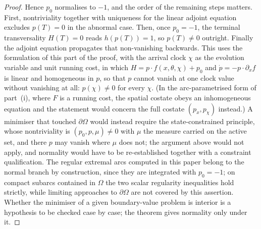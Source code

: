 \documentclass[12pt]{iopart}
\theoremstyle{plain}
\theoremstyle{definition}
\theoremstyle{plain}
\theoremstyle{remark}
\begin{document}
\begin{proof}
Hence $p_0$ normalises to $-1$, and the order of the remaining steps matters.
First, nontriviality together with uniqueness for the linear adjoint equation
excludes $p(T)=0$ in the abnormal case. Then, once $p_0=-1$, the terminal
transversality $H(T)=0$ reads $h(p(T))=1$, so $p(T)\neq0$ outright. Finally the
adjoint equation propagates that non-vanishing backwards. This uses the formulation of
this part of the proof, with the arrival clock $\chi$ as the evolution variable and unit
running cost, in which $H=p\cdot f(x,\theta,\chi)+p_0$ and $\dot p=-p\cdot\partial_xf$ is
linear and homogeneous in $p$, so that $p$ cannot vanish at one clock value without
vanishing at all: $p(\chi)\neq0$ for every $\chi$. (In the arc-parametrised form of part~(i),
where $F$ is a running cost, the spatial costate obeys an inhomogeneous equation and the
statement would concern the full costate $(p_x,p_\chi)$ instead.) A minimiser that touched $\partial\Omega$ would instead require the
state-constrained principle, whose nontriviality is $(p_0,p,\mu)\neq0$ with $\mu$ the
measure carried on the active set, and there $p$ may vanish where $\mu$ does not; the
argument above would not apply, and normality would have to be re-established together
with a constraint qualification. The regular extremal arcs computed in this paper belong to
the normal branch by construction, since they are integrated with $p_0=-1$; on compact
subarcs contained in $\Omega$ the two scalar regularity inequalities hold strictly, while
limiting approaches to $\partial\Omega$ are not covered by this assertion. Whether the minimiser of a given boundary-value problem is
interior is a hypothesis to be checked case by case; the theorem gives normality only
under it.
\end{proof}
\end{document}
